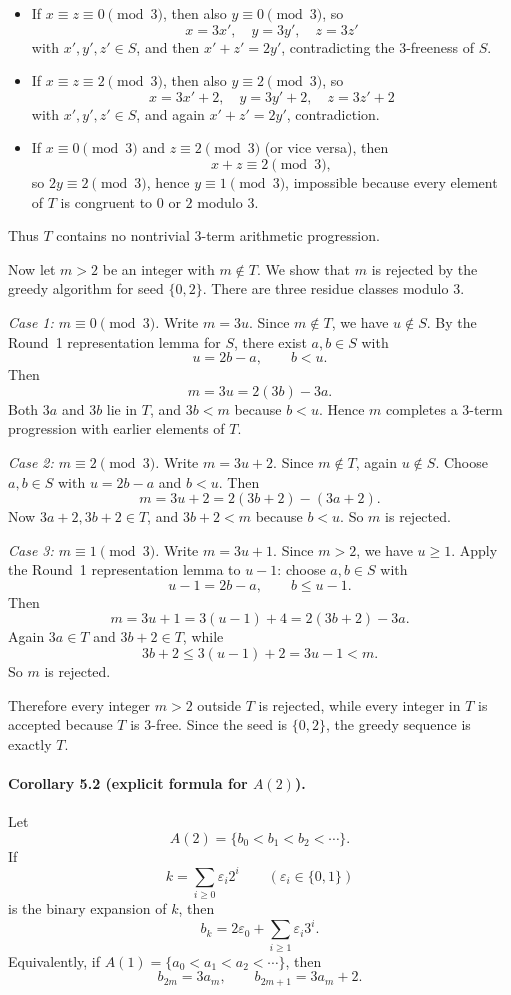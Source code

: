 \begin{itemize}
\item If $x\equiv z\equiv 0\pmod 3$, then also $y\equiv 0\pmod 3$, so
\[
x=3x',\quad y=3y',\quad z=3z'
\]
with $x',y',z'\in S$, and then $x'+z'=2y'$, contradicting the 3-freeness of $S$.

\item If $x\equiv z\equiv 2\pmod 3$, then also $y\equiv 2\pmod 3$, so
\[
x=3x'+2,\quad y=3y'+2,\quad z=3z'+2
\]
with $x',y',z'\in S$, and again $x'+z'=2y'$, contradiction.

\item If $x\equiv 0\pmod 3$ and $z\equiv 2\pmod 3$ (or vice versa), then
\[
x+z\equiv 2\pmod 3,
\]
so $2y\equiv 2\pmod 3$, hence $y\equiv 1\pmod 3$, impossible because every element of $T$ is congruent to $0$ or $2$ modulo $3$.
\end{itemize}

Thus $T$ contains no nontrivial 3-term arithmetic progression.

Now let $m>2$ be an integer with $m\notin T$. We show that $m$ is rejected by the greedy algorithm for seed $\{0,2\}$.
There are three residue classes modulo $3$.

\smallskip
\noindent
\emph{Case 1: $m\equiv 0\pmod 3$.}
Write $m=3u$. Since $m\notin T$, we have $u\notin S$.
By the Round~1 representation lemma for $S$, there exist $a,b\in S$ with
\[
u=2b-a,
\qquad b<u.
\]
Then
\[
m=3u=2(3b)-3a.
\]
Both $3a$ and $3b$ lie in $T$, and $3b<m$ because $b<u$. Hence $m$ completes a 3-term progression with earlier elements of $T$.

\smallskip
\noindent
\emph{Case 2: $m\equiv 2\pmod 3$.}
Write $m=3u+2$. Since $m\notin T$, again $u\notin S$.
Choose $a,b\in S$ with $u=2b-a$ and $b<u$.
Then
\[
m=3u+2=2(3b+2)-(3a+2).
\]
Now $3a+2,3b+2\in T$, and $3b+2<m$ because $b<u$. So $m$ is rejected.

\smallskip
\noindent
\emph{Case 3: $m\equiv 1\pmod 3$.}
Write $m=3u+1$. Since $m>2$, we have $u\ge 1$.
Apply the Round~1 representation lemma to $u-1$: choose $a,b\in S$ with
\[
u-1=2b-a,
\qquad b\le u-1.
\]
Then
\[
m=3u+1=3(u-1)+4=2(3b+2)-3a.
\]
Again $3a\in T$ and $3b+2\in T$, while
\[
3b+2\le 3(u-1)+2=3u-1<m.
\]
So $m$ is rejected.

Therefore every integer $m>2$ outside $T$ is rejected, while every integer in $T$ is accepted because $T$ is 3-free. Since the seed is $\{0,2\}$, the greedy sequence is exactly $T$. 

\paragraph{Corollary 5.2 (explicit formula for $A(2)$).}
Let
\[
A(2)=\{b_0<b_1<b_2<\cdots\}.
\]
If
\[
k=\sum_{i\ge 0}\varepsilon_i 2^i
\qquad (\varepsilon_i\in\{0,1\})
\]
is the binary expansion of $k$, then
\[
b_k=2\varepsilon_0+\sum_{i\ge 1}\varepsilon_i 3^i.
\]
Equivalently, if $A(1)=\{a_0<a_1<a_2<\cdots\}$, then
\[
b_{2m}=3a_m,
\qquad
b_{2m+1}=3a_m+2.
\]

